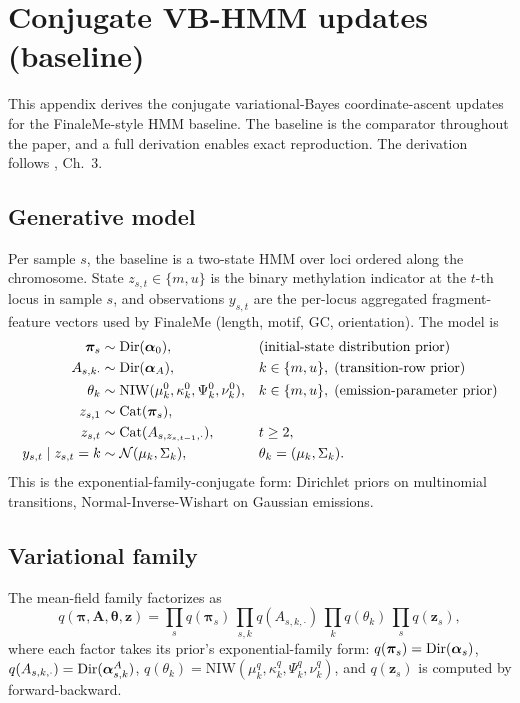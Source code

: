 \section{Conjugate VB-HMM updates (baseline)}
\label{app:vbhmm}

This appendix derives the conjugate variational-Bayes coordinate-ascent updates for the FinaleMe-style HMM baseline. The baseline is the comparator throughout the paper, and a full derivation enables exact reproduction. The derivation follows \citet{beal2003}, Ch.~3.

\subsection*{Generative model}
Per sample $s$, the baseline is a two-state HMM over loci ordered along the chromosome. State $z_{s,t}\in\{m,u\}$ is the binary methylation indicator at the $t$-th locus in sample $s$, and observations $y_{s,t}$ are the per-locus aggregated fragment-feature vectors used by FinaleMe (length, motif, GC, orientation). The model is
\begin{align}
\bm\pi_s &\sim \mathrm{Dir}(\bm\alpha_0), &&\text{(initial-state distribution prior)} \\
A_{s,k\cdot} &\sim \mathrm{Dir}(\bm\alpha_A), && k\in\{m,u\},\;\text{(transition-row prior)}\\
\theta_k &\sim \mathrm{NIW}(\mu_k^0,\kappa_k^0,\Psi_k^0,\nu_k^0), && k\in\{m,u\},\;\text{(emission-parameter prior)}\\
z_{s,1} &\sim \mathrm{Cat}(\bm\pi_s),\\
z_{s,t} &\sim \mathrm{Cat}(A_{s,z_{s,t-1},\cdot}),&&t\ge 2,\\
y_{s,t}\mid z_{s,t}=k &\sim \mathcal{N}(\mu_k,\Sigma_k), && \theta_k=(\mu_k,\Sigma_k).
\end{align}
This is the exponential-family-conjugate form: Dirichlet priors on multinomial transitions, Normal-Inverse-Wishart on Gaussian emissions.

\subsection*{Variational family}
The mean-field family factorizes as
\begin{equation}
q(\bm\pi,\bm A,\bm\theta,\bm z) = \prod_s q(\bm\pi_s)\,\prod_{s,k} q(A_{s,k,\cdot})\,\prod_k q(\theta_k)\,\prod_s q(\bm z_s),
\end{equation}
where each factor takes its prior's exponential-family form: $q(\bm\pi_s)=\mathrm{Dir}(\bm\alpha_s)$, $q(A_{s,k,\cdot})=\mathrm{Dir}(\bm\alpha^A_{s,k})$, $q(\theta_k)=\mathrm{NIW}(\mu^q_k,\kappa^q_k,\Psi^q_k,\nu^q_k)$, and $q(\bm z_s)$ is computed by forward-backward.

